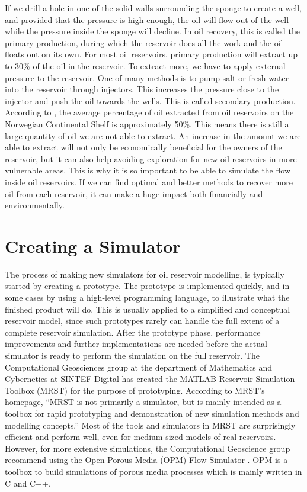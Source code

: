 If we drill a hole in one of the solid walls surrounding the sponge to create a well, and provided that the pressure is high enough, the oil will flow out of the well while the pressure inside the sponge will decline. In oil recovery, this is called the primary production, during which the reservoir does all the work and the oil floats out on its own. For most oil reservoirs, primary production will extract up to 30\% of the oil in the reservoir. To extract more, we have to apply external pressure to the reservoir. One of many methods is to pump salt or fresh water into the reservoir through injectors. This increases the pressure close to the injector and push the oil towards the wells. This is called secondary production. According to \citep{lieMrstUrl}, the average percentage of oil extracted from oil reservoirs on the Norwegian Continental Shelf is approximately 50\%. This means there is still a large quantity of oil we are not able to extract. An increase in the amount we are able to extract will not only be economically beneficial for the owners of the reservoir, but it can also help avoiding exploration for new oil reservoirs in more vulnerable areas. This is why it is so important to be able to simulate the flow inside oil reservoirs. If we can find optimal and better methods to recover more oil from each reservoir, it can make a huge impact both financially and environmentally.

\section{Creating a Simulator}
The process of making new simulators for oil reservoir modelling, is typically started by creating a prototype. The prototype is implemented quickly, and in some cases by using a high-level programming language, to illustrate what the finished product will do. This is usually applied to a simplified and conceptual reservoir model, since such prototypes rarely can handle the full extent of a complete reservoir simulation. After the prototype phase, performance improvements and further implementations are needed before the actual simulator is ready to perform the simulation on the full reservoir. The Computational Geosciences group at the department of Mathematics and Cybernetics at SINTEF Digital has created the MATLAB Reservoir Simulation Toolbox (MRST) \emph{\citep{mrstHomepage}} for the  purpose of prototyping. According to MRST's homepage, \enquote{MRST is not primarily a simulator, but is mainly intended as a toolbox for rapid prototyping and demonstration of new simulation methods and modelling concepts.} Most of the tools and simulators in MRST are surprisingly efficient and perform well, even for medium-sized models of real reservoirs. However, for more extensive simulations, the Computational Geoscience group recommend using the Open Porous Media (OPM) Flow Simulator \emph{\citep{opm}}. OPM is a toolbox to build simulations of porous media processes which is mainly written in C and C++. 

